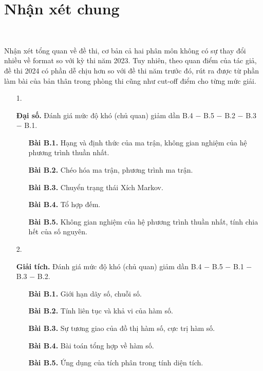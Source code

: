 \section{Nhận xét chung}
~

Nhận xét tổng quan về đề thi, cơ bản cả hai phân môn không có sự thay đổi nhiều về format so với kỳ thi năm 2023. Tuy nhiên, theo quan điểm của tác giả, đề thi 2024 có phần dễ chịu hơn so với đề thi năm trước đó, rút ra được từ phần làm bài của bản thân trong phòng thi cũng như cut-off điểm cho từng mức giải. 

\begin{enumerate}
    \item[1. ] {\textbf{Đại số. } Đánh giá mức độ khó (chủ quan) giảm dần B.4 $-$ B.5 $-$ B.2 $-$ B.3 $-$ B.1.
    \begin{enumerate}
        \item[] {\textbf{Bài B.1.} Hạng và định thức của ma trận, không gian nghiệm của hệ phương trình thuần nhất.}
        \item[] {\textbf{Bài B.2.} Chéo hóa ma trận, phương trình ma trận.}
        \item[] {\textbf{Bài B.3.} Chuyển trạng thái Xích Markov.}
        \item[] {\textbf{Bài B.4.} Tổ hợp đếm.}
        \item[] {\textbf{Bài B.5.} Không gian nghiệm của hệ phương trình thuần nhất, tính chia hết của số nguyên.}
    \end{enumerate}}
    \item[2. ] {\textbf{Giải tích. } Đánh giá mức độ khó (chủ quan) giảm dần B.4 $-$ B.5 $-$ B.1 $-$ B.3 $-$ B.2.
    \begin{enumerate}
        \item[] {\textbf{Bài B.1.} Giới hạn dãy số, chuỗi số.}
        \item[] {\textbf{Bài B.2.} Tính liên tục và khả vi của hàm số.}
        \item[] {\textbf{Bài B.3.} Sự tương giao của đồ thị hàm số, cực trị hàm số.}
        \item[] {\textbf{Bài B.4.} Bài toán tổng hợp về hàm số.}
        \item[] {\textbf{Bài B.5.} Ứng dụng của tích phân trong tính diện tích.}
    \end{enumerate}}
\end{enumerate}